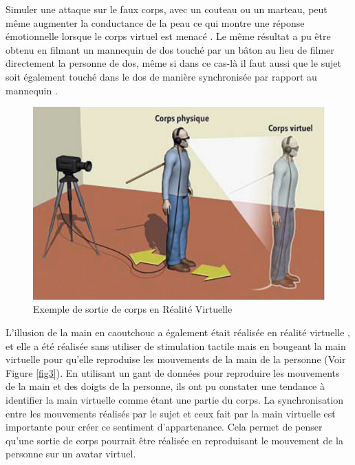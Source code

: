 Simuler une attaque sur le faux corps, avec un couteau ou un marteau, peut même augmenter la conductance de la peau ce qui montre une réponse émotionnelle lorsque le corps virtuel est menacé \cite{eh07}. Le même résultat a pu être obtenu en filmant un mannequin de dos touché par un bâton au lieu de filmer directement la personne de dos, même si dans ce cas-là il faut aussi que le sujet soit également touché dans le dos de manière synchronisée par rapport au mannequin \cite{le07}.\\

\begin{figure}[h]
   	\centerline{\includegraphics[scale=0.6]{images/biblio/oobRV}}
   	\caption{\label{fig2} Exemple de sortie de corps en Réalité Virtuelle \cite{bl10}}
\end{figure}

L'illusion de la main en caoutchouc a également était réalisée en réalité virtuelle \cite{sl09}, et elle a été réalisée sans utiliser de stimulation tactile mais en bougeant la main virtuelle pour qu'elle reproduise les mouvements de la main de la personne \cite{sl08}(Voir Figure \ref{fig3}). En utilisant un gant de données pour reproduire les mouvements de la main et des doigts de la personne, ils ont pu constater une tendance à identifier la main virtuelle comme étant une partie du corps. La synchronisation entre les mouvements réalisés par le sujet et ceux fait par la main virtuelle est importante pour créer ce sentiment d'appartenance. Cela permet de penser qu'une sortie de corps pourrait être réalisée en reproduisant le mouvement de la personne sur un avatar virtuel.


